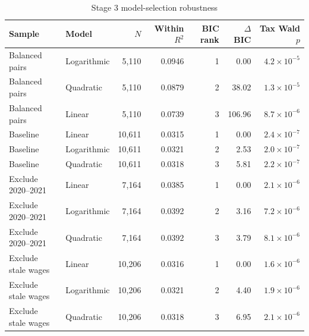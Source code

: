 \begin{table}[H]
\centering
\footnotesize
\setlength{\tabcolsep}{3pt}
\caption{Stage 3 model-selection robustness}
\label{tab:app_stage3_robustness}
\begin{tabular}{@{}llrrrrr@{}}
\toprule
Sample & Model & $N$ & Within $R^2$ & BIC rank & $\Delta$BIC & Tax Wald $p$ \\
\midrule
Balanced pairs & Logarithmic &  5,110 & 0.0946 & 1 &   0.00 & $4.2 \times 10^{-5}$ \\
Balanced pairs & Quadratic &  5,110 & 0.0879 & 2 &  38.02 & $1.3 \times 10^{-5}$ \\
Balanced pairs & Linear &  5,110 & 0.0739 & 3 & 106.96 & $8.7 \times 10^{-6}$ \\
Baseline & Linear & 10,611 & 0.0315 & 1 &   0.00 & $2.4 \times 10^{-7}$ \\
Baseline & Logarithmic & 10,611 & 0.0321 & 2 &   2.53 & $2.0 \times 10^{-7}$ \\
Baseline & Quadratic & 10,611 & 0.0318 & 3 &   5.81 & $2.2 \times 10^{-7}$ \\
Exclude 2020–2021 & Linear &  7,164 & 0.0385 & 1 &   0.00 & $2.1 \times 10^{-6}$ \\
Exclude 2020–2021 & Logarithmic &  7,164 & 0.0392 & 2 &   3.16 & $7.2 \times 10^{-6}$ \\
Exclude 2020–2021 & Quadratic &  7,164 & 0.0392 & 3 &   3.79 & $8.1 \times 10^{-6}$ \\
Exclude stale wages & Linear & 10,206 & 0.0316 & 1 &   0.00 & $1.6 \times 10^{-6}$ \\
Exclude stale wages & Logarithmic & 10,206 & 0.0321 & 2 &   4.40 & $1.9 \times 10^{-6}$ \\
Exclude stale wages & Quadratic & 10,206 & 0.0318 & 3 &   6.95 & $2.1 \times 10^{-6}$ \\
\bottomrule
\end{tabular}
\end{table}
